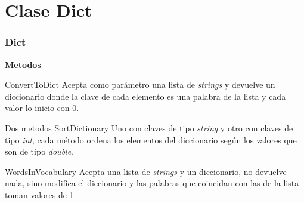 
\section{Clase Dict}
\begin{frame}
    \frametitle{Dict}
  \textbf{Metodos}
  \begin{block}{ConvertToDict}
     Acepta como parámetro una lista de \textit{strings }y devuelve
    un diccionario donde la clave de cada elemento es una palabra de la
    lista y cada valor lo inicio con 0.
  \end{block}
    \pause
    \begin{block}{Dos metodos SortDictionary}
    Uno con claves de tipo \textit{string} y otro con
    claves de tipo \textit{int}, cada método ordena los elementos del diccionario
    según los valores que son de tipo \textit{double}.
    \end{block}
    \pause
    \begin{block}{WordsInVocabulary} 
    Acepta una lista de \textit{strings} y un diccionario, no
    devuelve nada, sino modifica el diccionario y las palabras que coincidan
    con las de la lista toman valores de 1.
    \end{block}
  
\end{frame}